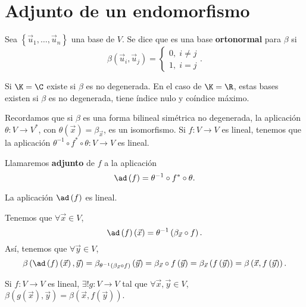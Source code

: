 \section{Adjunto de un endomorfismo}
\begin{fdefinition}[]
	\normalfont Sea $\displaystyle \left\{ \vec{u}_{1}, \ldots, \vec{u}_{n}\right\}  $ una base de $\displaystyle V $. Se dice que es una base \textbf{ortonormal} para $\displaystyle \beta  $ si
	\[ \beta\left(\vec{u}_{i}, \vec{u}_{j}\right) = 
	\begin{cases}
	0, \; i \neq j \\
	1, \; i = j
	\end{cases}
	.\]
\end{fdefinition}
\begin{observation}
\normalfont Si $\displaystyle \K = \C $ existe si $\displaystyle \beta  $ es no degenerada. En el caso de $\displaystyle \K = \R $, estas bases existen si $\displaystyle \beta  $ es no degenerada, tiene índice nulo y coíndice máximo. 
\end{observation}
Recordamos que si $\displaystyle \beta  $ es una forma bilineal simétrica no degenerada, la aplicación $\displaystyle \theta : V \to V^{*} $, con $\displaystyle \theta\left(\vec{x}\right) = \beta_{\vec{x}} $, es un isomorfismo. Si $\displaystyle f : V \to V $ es lineal, tenemos que la aplicación $\displaystyle \theta^{-1}\circ f^{*}\circ\theta : V \to V $ es lineal.
\begin{fdefinition}[Adjunto]
\normalfont Llamaremos \textbf{adjunto} de $\displaystyle f $ a la aplicación
\[ \ad\left(f\right) = \theta^{-1}\circ f^{*}\circ \theta .\]
\end{fdefinition}
\begin{observation}
\normalfont La aplicación $\displaystyle \ad\left(f\right) $ es lineal.
\end{observation}
Tenemos que $\displaystyle \forall \vec{x} \in V $,
\[\ad\left(f\right)\left(\vec{x}\right) = \theta^{-1}\left(\beta_{\vec{x}}\circ f\right) .\]
Así, tenemos que $\displaystyle \forall \vec{y} \in V $,
\[ \beta\left(\ad\left(f\right)\left(\vec{x}\right), \vec{y}\right) = \beta_{\theta^{-1}\left(\beta_{\vec{x}}\circ f\right)}\left(\vec{y}\right)= \beta_{\vec{x}}\circ f\left(\vec{y}\right) = \beta_{\vec{x}}\left(f\left(\vec{y}\right)\right) =\beta\left(\vec{x}, f\left(\vec{y}\right)\right) .\]
\begin{fprop}[]
\normalfont Si $\displaystyle f : V \to V $ es lineal, $\displaystyle \exists ! g : V \to V $ tal que $\displaystyle \forall \vec{x}, \vec{y} \in V $, $\displaystyle \beta\left(g\left(\vec{x}\right), \vec{y}\right) = \beta\left(\vec{x}, f\left(\vec{y}\right)\right) $.
\end{fprop}
